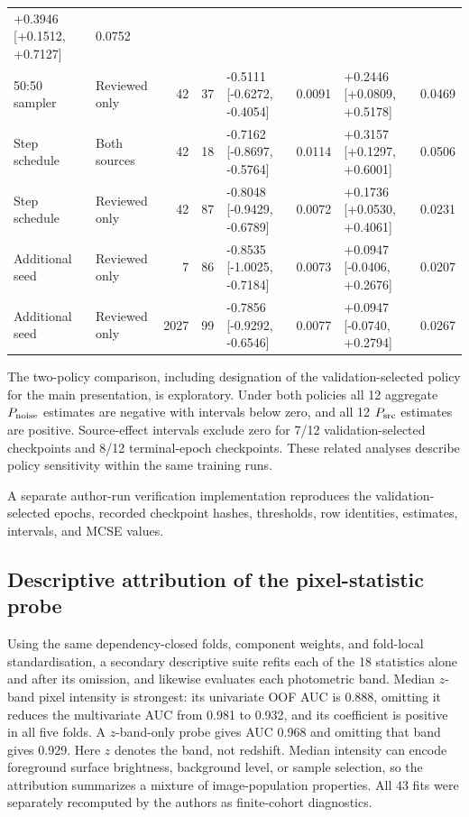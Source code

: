 \begin{table}
\begin{center}
\begin{tabular}{L{0.095\textwidth}L{0.075\textwidth}r r
                L{0.23\textwidth}r L{0.23\textwidth}r}
+0.3946 [+0.1512, +0.7127] & 0.0752 \\
50:50 sampler & Reviewed only & 42 & 37 & -0.5111 [-0.6272, -0.4054] & 0.0091 &
+0.2446 [+0.0809, +0.5178] & 0.0469 \\
\addlinespace
Step schedule & Both sources & 42 & 18 & -0.7162 [-0.8697, -0.5764] & 0.0114 &
+0.3157 [+0.1297, +0.6001] & 0.0506 \\
Step schedule & Reviewed only & 42 & 87 & -0.8048 [-0.9429, -0.6789] & 0.0072 &
+0.1736 [+0.0530, +0.4061] & 0.0231 \\
\addlinespace
Additional seed & Reviewed only & 7 & 86 & -0.8535 [-1.0025, -0.7184] & 0.0073 &
+0.0947 [-0.0406, +0.2676] & 0.0207 \\
Additional seed & Reviewed only & 2027 & 99 & -0.7856 [-0.9292, -0.6546] & 0.0077 &
+0.0947 [-0.0740, +0.2794] & 0.0267 \\
\bottomrule
\end{tabular}
\end{center}
\end{table}

The two-policy comparison, including designation of the validation-selected
policy for the main presentation, is exploratory. Under both policies all
12 aggregate \(P_{\rm noise}\) estimates are negative with intervals below
zero, and all 12 \(P_{\rm src}\) estimates are positive. Source-effect
intervals exclude zero for 7/12 validation-selected checkpoints and 8/12
terminal-epoch checkpoints. These related analyses describe policy
sensitivity within the same training runs.

A separate author-run
verification implementation reproduces the validation-selected epochs,
recorded checkpoint hashes, thresholds, row identities, estimates, intervals,
and MCSE values.

\subsection{Descriptive attribution of the pixel-statistic probe}

Using the same dependency-closed folds, component weights, and fold-local
standardisation, a secondary descriptive suite refits each of the 18
statistics alone and after its omission, and likewise evaluates each
photometric band. Median \(z\)-band pixel intensity is strongest: its
univariate OOF AUC is 0.888, omitting it reduces the multivariate AUC from
0.981 to 0.932, and its coefficient is positive in all five folds.
A \(z\)-band-only probe gives AUC 0.968 and omitting that band gives 0.929.
Here \(z\) denotes the band, not redshift. Median intensity can encode
foreground surface brightness, background level, or sample selection, so
the attribution summarizes a mixture of image-population properties. All 43
fits were separately recomputed by the authors as finite-cohort diagnostics.

